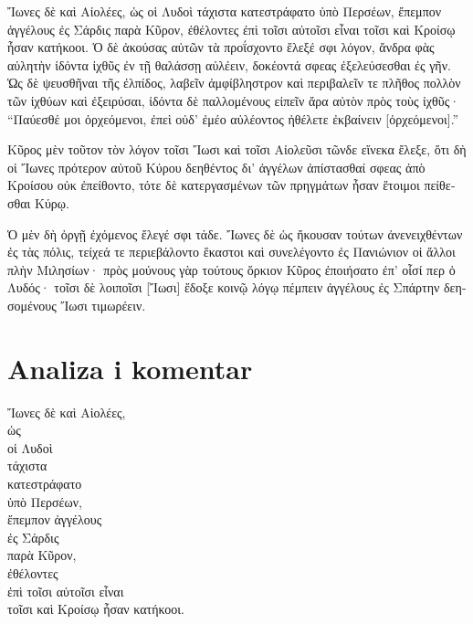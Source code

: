
\medskip

\begin{greek}
{\large
{ \noindent Ἴωνες δὲ καὶ Αἰολέες, ὡς οἱ Λυδοὶ τάχιστα κατεστράφατο ὑπὸ Περσέων, ἔπεμπον ἀγγέλους ἐς Σάρδις παρὰ Κῦρον, ἐθέλοντες ἐπὶ τοῖσι αὐτοῖσι εἶναι τοῖσι καὶ Κροίσῳ ἦσαν κατήκοοι. Ὁ δὲ ἀκούσας αὐτῶν τὰ προΐσχοντο ἔλεξέ σφι λόγον, ἄνδρα φὰς αὐλητὴν ἰδόντα ἰχθῦς ἐν τῇ θαλάσσῃ αὐλέειν, δοκέοντά σφεας ἐξελεύσεσθαι ἐς γῆν. Ὡς δὲ ψευσθῆναι τῆς ἐλπίδος, λαβεῖν ἀμφίβληστρον καὶ περιβαλεῖν τε πλῆθος πολλὸν τῶν ἰχθύων καὶ ἐξειρύσαι, ἰδόντα δὲ παλλομένους εἰπεῖν ἄρα αὐτὸν πρὸς τοὺς ἰχθῦς· ``Παύεσθέ μοι ὀρχεόμενοι, ἐπεὶ οὐδ' ἐμέο αὐλέοντος ἠθέλετε ἐκβαίνειν [ὀρχεόμενοι].'' 

Κῦρος μὲν τοῦτον τὸν λόγον τοῖσι Ἴωσι καὶ τοῖσι Αἰολεῦσι τῶνδε εἵνεκα ἔλεξε, ὅτι δὴ οἱ Ἴωνες πρότερον αὐτοῦ Κύρου δεηθέντος δι' ἀγγέλων ἀπίστασθαί σφεας ἀπὸ Κροίσου οὐκ ἐπείθοντο, τότε δὲ κατεργασμένων τῶν πρηγμάτων ἦσαν ἕτοιμοι πείθεσθαι Κύρῳ. 

Ὁ μὲν δὴ ὀργῇ ἐχόμενος ἔλεγέ σφι τάδε.  Ἴωνες δὲ ὡς ἤκουσαν τούτων ἀνενειχθέντων ἐς τὰς πόλις, τείχεά τε περιεβάλοντο ἕκαστοι καὶ συνελέγοντο ἐς Πανιώνιον οἱ ἄλλοι πλὴν Μιλησίων· πρὸς μούνους γὰρ τούτους ὅρκιον Κῦρος ἐποιήσατο ἐπ' οἷσί περ ὁ Λυδός· τοῖσι δὲ λοιποῖσι [Ἴωσι] ἔδοξε κοινῷ λόγῳ πέμπειν ἀγγέλους ἐς Σπάρτην δεησομένους Ἴωσι τιμωρέειν.
}
}
\end{greek}

\section*{Analiza i komentar}


{\large
\begin{greek}
\noindent Ἴωνες δὲ καὶ Αἰολέες, \\
\tabto{2em} ὡς \\
\tabto{4em} οἱ Λυδοὶ \\
\tabto{6em} τάχιστα \\
\tabto{4em} κατεστράφατο \\
\tabto{6em} ὑπὸ Περσέων, \\
ἔπεμπον ἀγγέλους \\
\tabto{2em} ἐς Σάρδις \\
\tabto{2em} παρὰ Κῦρον, \\
ἐθέλοντες \\
\tabto{2em} ἐπὶ τοῖσι αὐτοῖσι εἶναι \\
\tabto{4em} τοῖσι καὶ Κροίσῳ ἦσαν κατήκοοι.\\

\end{greek}
}

